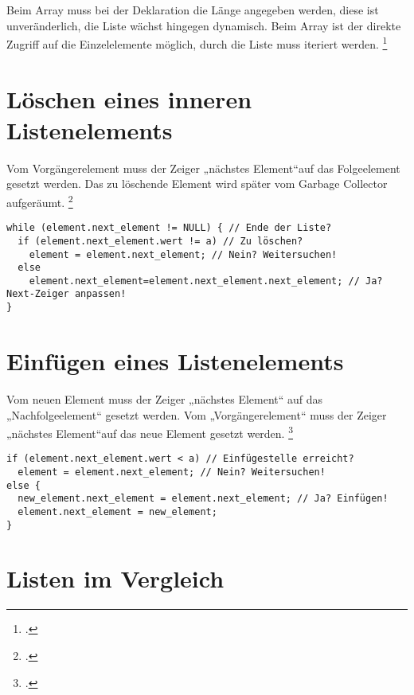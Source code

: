 \documentclass{lehramt-informatik-haupt}
\begin{document}
Beim Array muss bei der Deklaration die Länge angegeben werden, diese
ist unveränderlich, die Liste wächst hingegen dynamisch. Beim Array
ist der direkte Zugriff auf die Einzelelemente möglich, durch die Liste
muss iteriert werden.
\footcite[Seite 4]{aud:fs:4}

%

\section{Löschen eines inneren Listenelements}

Vom Vorgängerelement muss der Zeiger „nächstes Element“auf das
Folgeelement gesetzt werden. Das zu löschende Element wird später vom
Garbage Collector aufgeräumt.
\footcite[Seite 9-10]{aud:fs:4}

\begin{verbatim}
while (element.next_element != NULL) { // Ende der Liste?
  if (element.next_element.wert != a) // Zu löschen?
    element = element.next_element; // Nein? Weitersuchen!
  else
    element.next_element=element.next_element.next_element; // Ja? Next-Zeiger anpassen!
}
\end{verbatim}

\section{Einfügen eines Listenelements}

Vom neuen Element muss der Zeiger „nächstes Element“ auf das
„Nachfolgeelement“ gesetzt werden. Vom „Vorgängerelement“ muss der
Zeiger „nächstes Element“auf das neue Element gesetzt werden.
\footcite[Seite 11-12]{aud:fs:4}

\begin{verbatim}
if (element.next_element.wert < a) // Einfügestelle erreicht?
  element = element.next_element; // Nein? Weitersuchen!
else {
  new_element.next_element = element.next_element; // Ja? Einfügen!
  element.next_element = new_element;
}
\end{verbatim}

%

\section{Listen im Vergleich}
\end{document}
